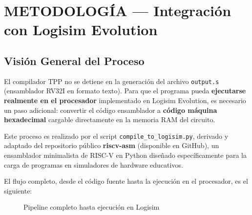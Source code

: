\chapter{METODOLOGÍA — Integración con Logisim Evolution}

\section{Visión General del Proceso}

El compilador TPP no se detiene en la generación del archivo \texttt{output.s} (ensamblador RV32I en formato texto). Para que el programa pueda \textbf{ejecutarse realmente en el procesador} implementado en Logisim Evolution, es necesario un paso adicional: convertir el código ensamblador a \textbf{código máquina hexadecimal} cargable directamente en la memoria RAM del circuito.

Este proceso es realizado por el script \texttt{compile\_to\_logisim.py}, derivado y adaptado del repositorio público \textbf{riscv-asm} (disponible en GitHub), un ensamblador minimalista de RISC-V en Python diseñado específicamente para la carga de programas en simuladores de hardware educativos.

El flujo completo, desde el código fuente hasta la ejecución en el procesador, es el siguiente:

\begin{figure}[H]
\centering
{}
\caption{Pipeline completo hasta ejecución en Logisim}
\label{fig:pipeline-logisim}
\end{figure}


